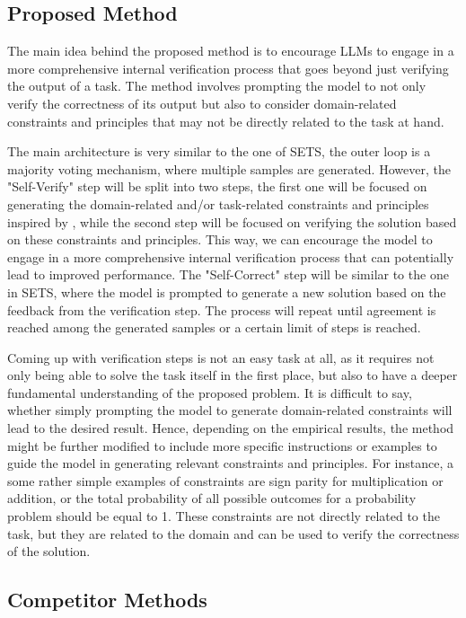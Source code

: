 \documentclass{article}
\begin{document}
\subsection{Proposed Method}
The main idea behind the proposed method is to encourage LLMs to engage in a more comprehensive internal verification process that goes beyond just verifying the output of a task. The method involves prompting the model to not only verify the correctness of its output but also to consider domain-related constraints and principles that may not be directly related to the task at hand.

The main architecture is very similar to the one of SETS, the outer loop is a majority voting mechanism, where multiple samples are generated. However, the "Self-Verify" step will be split into two steps, the first one will be focused on generating the domain-related and/or task-related constraints and principles inspired by \cite{factprompt}, while the second step will be focused on verifying the solution based on these constraints and principles. This way, we can encourage the model to engage in a more comprehensive internal verification process that can potentially lead to improved performance. The "Self-Correct" step will be similar to the one in SETS, where the model is prompted to generate a new solution based on the feedback from the verification step. The process will repeat until agreement is reached among the generated samples or a certain limit of steps is reached.

Coming up with verification steps is not an easy task at all, as it requires not only being able to solve the task itself in the first place, but also to have a deeper fundamental understanding of the proposed problem. It is difficult to say, whether simply prompting the model to generate domain-related constraints will lead to the desired result. Hence, depending on the empirical results, the method might be further modified to include more specific instructions or examples to guide the model in generating relevant constraints and principles. For instance, a some rather simple examples of constraints are sign parity for multiplication or addition, or the total probability of all possible outcomes for a probability problem should be equal to 1. These constraints are not directly related to the task, but they are related to the domain and can be used to verify the correctness of the solution.


\subsection{Competitor Methods}
\end{document}

